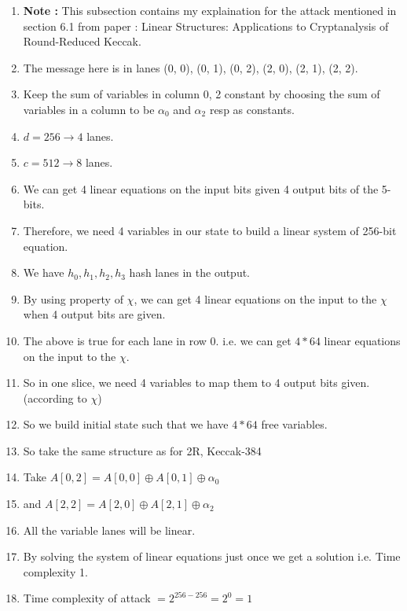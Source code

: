 \documentclass{article}
\begin{document}
\begin{enumerate}
    \item \textbf{Note :} This subsection contains my explaination for the attack mentioned in section 6.1 from paper : Linear Structures: Applications to Cryptanalysis
of Round-Reduced Keccak.
    \item The message here is in lanes (0, 0), (0, 1), (0, 2), (2, 0), (2, 1), (2, 2).
    \item Keep the sum of variables in column 0, 2 constant by choosing the sum of variables in a column to be $\alpha_0 $ and $\alpha_2$ resp as constants.
    \item $d = 256 \rightarrow 4$ lanes.
    \item $c = 512 \rightarrow 8$ lanes.
    \item We can get 4 linear equations on the input bits given 4 output bits of the 5-bits.
    \item Therefore, we need 4 variables in our state to build a linear system of 256-bit equation.
    \item We have $h_0, h_1, h_2, h_3$  hash lanes in the output.
    \item By using property of $\chi$, we can get 4 linear equations on the input to the $\chi$ when 4 output bits are given.
    \item The above is true for each lane in row 0. i.e. we can get $4*64$ linear equations on the input to the $\chi$.
    \item So in one slice, we need 4 variables to map them to 4 output bits given. (according to $\chi$)
    \item So we build initial state such that we have $4*64$ free variables.
    \item So take the same structure as for 2R, Keccak-384
    \item Take $A[0, 2] = A[0, 0] \oplus A[0, 1] \oplus \alpha_0$
    \item and $A[2, 2] = A[2, 0] \oplus A[2, 1] \oplus \alpha_2$
    \item All the variable lanes will be linear.
    \item By solving the system of linear equations just once we get a solution i.e. Time complexity 1.
    \item Time complexity of attack $ = 2^{256 - 256} = 2^{0} = 1$
\end{enumerate}
\end{document}
